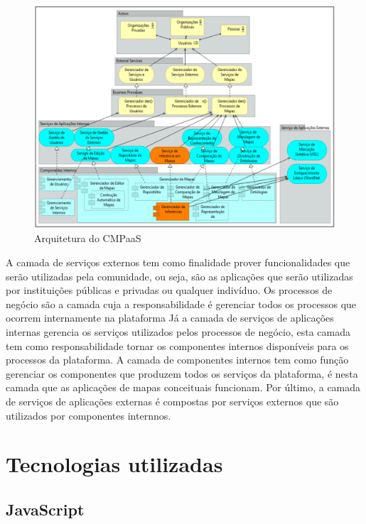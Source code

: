 \documentclass[
	12pt,				%
	openright,			%
	oneside,			%
	a4paper,			%
	english,			%
	french,				%
	spanish,			%
	brazil				%
	]{abntex2}
\begin{document}
\begin{figure}[htb]
	\caption{\label{fig_cmpaas2} Arquitetura do CMPaaS}
	\begin{center}
		\includegraphics[scale=0.3]{cmpaas2.png}
	\end{center}
\end{figure}

A camada de serviços externos tem como finalidade prover funcionalidades que serão utilizadas pela comunidade, ou seja, são as aplicações que serão utilizadas por instituições públicas e privadas ou qualquer indivíduo. Os processos de negócio são a camada cuja a responsabilidade é gerenciar todos os processos que ocorrem internamente na plataforma Já a camada de serviços de aplicações internas gerencia os serviços utilizados pelos processos de negócio, esta camada tem como responsabilidade tornar os componentes internos disponíveis para os processos da plataforma. A camada de componentes internos tem como função gerenciar os componentes que produzem todos os serviços da plataforma, é nesta camada que as aplicações de mapas conceituais funcionam. Por último, a camada de serviços de aplicações externas é compostas por serviços externos que são utilizados por componentes internnos\cite{Perin2014}.

\chapter{Tecnologias utilizadas}

\section{JavaScript}
\end{document}
